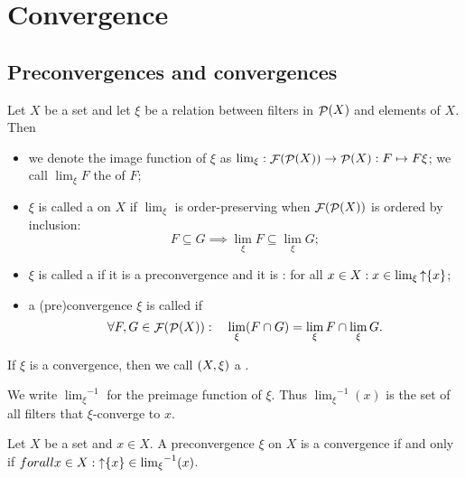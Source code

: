 \chapter{Convergence}
\section{Preconvergences and convergences}
\begin{definition}
Let $X$ be a set and let $\xi$ be a relation between filters in $\mathop{\mathcal{P}}(X)$ and elements of $X$. Then
\begin{itemize}
\item we denote the image function of $\xi$ as $\lim_\xi: \mathop{\mathcal{F}}(\mathop{\mathcal{P}}(X)) \to \mathop{\mathcal{P}}(X): F\mapsto F\xi$; we call $\lim_\xi F$ the  of $F$;
\item $\xi$ is called a  on $X$ if $\lim_\xi$ is order-preserving when $\mathop{\mathcal{F}}(\mathop{\mathcal{P}}(X))$ is ordered by inclusion:
\[ F \subseteq G \implies \lim_\xi F \subseteq \lim_\xi G; \]
\item $\xi$ is called a  if it is a preconvergence and it is : for all $x\in X: x \in \lim_\xi \mathop{\uparrow}\{x\}$;
\item a (pre)convergence $\xi$ is called  if 
\[ \forall F,G \in \mathop{\mathcal{F}}(\mathop{\mathcal{P}}(X)): \quad \lim_\xi(F\cap G) = \lim_\xi F \cap \lim_\xi G. \]
\end{itemize}
If $\xi$ is a convergence, then we call $\left( X, \xi \right)$ a .
\end{definition}
We write ${\lim_\xi}^{-1}$ for the preimage function of $\xi$. Thus ${\lim_\xi}^{-1}(x)$ is the set of all filters that $\xi$-converge to $x$.

\begin{lemma}
Let $X$ be a set and $x\in X$. A preconvergence $\xi$ on $X$ is a convergence \textup{if and only if} $forall x\in X: \mathop{\uparrow} \{x\} \in {\lim_\xi}^{-1}(x)$.
\end{lemma}

